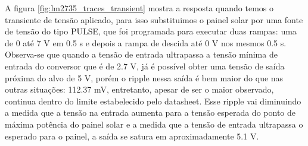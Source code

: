 \noindent
\begin{minipage}{\linewidth}
\label{fig:lm2735_transient}
\end{minipage}

\noindent
\begin{minipage}{\linewidth}
\label{fig:lm2735_traces_transient}
\end{minipage}

A figura \ref{fig:lm2735_traces_transient} mostra a resposta quando temos o transiente de tensão aplicado, para isso substituimos o painel solar por uma fonte de tensão do tipo PULSE, que foi programada para executar duas rampas: uma de 0 até 7 V em 0.5 s e depois a rampa de descida até 0 V nos mesmos 0.5 s. Observa-se que quando a tensão de entrada ultrapassa a tensão mínima de entrada do conversor que é de 2.7 V, já é possível obter uma tensão de saída próxima do alvo de 5 V, porém o ripple nessa saída é bem maior do que nas outras situações: 112.37 mV, entretanto, apesar de ser o maior observado, continua dentro do limite estabelecido pelo datasheet. Esse ripple vai diminuindo a medida que a tensão na entrada aumenta para a tensão esperada do ponto de máxima potência do painel solar e a medida que a tensão de entrada ultrapassa o esperado para o painel, a saída se satura em aproximadamente 5.1 V.

